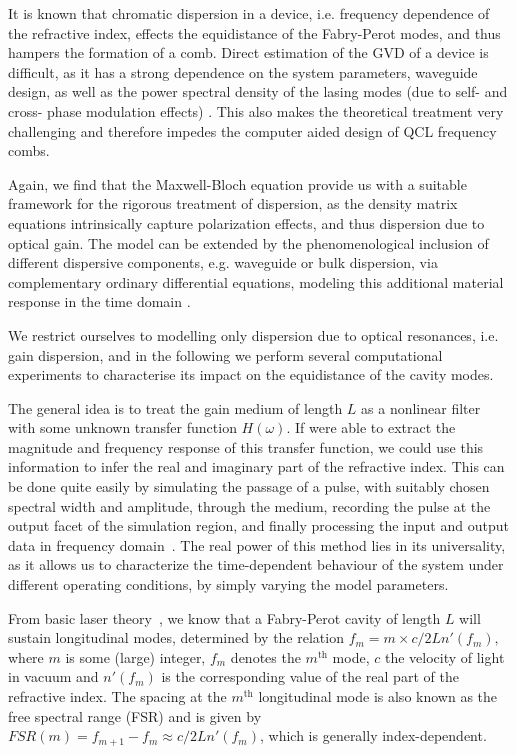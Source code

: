 \documentclass[journal]{IEEEtran}
\begin{document}
	It is known that chromatic dispersion in a device, i.e. frequency dependence of the refractive index, effects the equidistance of the Fabry-Perot modes, and thus hampers the formation of a comb. Direct estimation of the GVD of a device is difficult, as it has a strong dependence on the system parameters, waveguide design, as well as the power spectral density of the lasing modes (due to self- and cross- phase modulation effects) \cite{villares2016dispersion}. This also makes the theoretical treatment very challenging and therefore impedes the computer aided design of QCL frequency combs.
	
	Again, we find that the Maxwell-Bloch equation provide us with a  suitable framework for the rigorous treatment of dispersion, as the density matrix equations intrinsically capture polarization effects, and thus dispersion due to optical gain. The model can be extended by the phenomenological inclusion of different dispersive components, e.g. waveguide or bulk dispersion, via complementary ordinary differential equations, modeling this additional material response in the time domain \cite{taflove2000computational}.
	
	We restrict ourselves to modelling only dispersion due to optical resonances, i.e. gain dispersion, and in the following we perform several computational experiments to characterise its impact on the equidistance of the cavity modes.
	
	The general idea is to treat the gain medium of length $L$ as a nonlinear filter with some unknown transfer function $H(\omega)$. If were able to extract the magnitude and frequency response of this transfer function, we could use this information to infer the real and imaginary part of the refractive index. This can be done quite easily by simulating the passage of a pulse, with suitably chosen spectral width and amplitude, through the medium, recording the pulse at the output facet of the simulation region, and finally processing the input and output data in frequency domain~\cite{petz2016}. The real power of this method lies in its universality, as it allows us to characterize the time-dependent behaviour of the system under different operating conditions, by simply varying the model parameters.
	
	From basic laser theory~\cite{siegman1986lasers}, we know that a Fabry-Perot cavity of length $L$ will sustain longitudinal modes, determined by the relation $f_m = m \times c/2 L n'(f_m),$ where $m$ is some (large) integer, $f_m$ denotes the $m^{\text{th}}$ mode, $c$ the velocity of light in vacuum and $n'(f_m)$ is the corresponding value of the real part of the refractive index. The spacing at the $m^{\text{th}}$ longitudinal mode is also known as the free spectral range (FSR) and is given by $FSR(m)=f_{m+1}-f_{m}\approx c/2 L n'(f_m)$, which is generally index-dependent.
	
\end{document}
